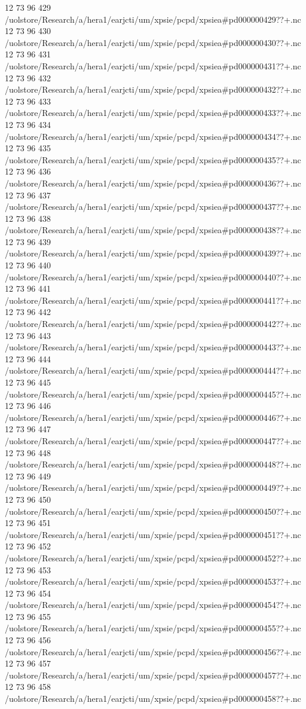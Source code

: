 12 73 96
429
/uolstore/Research/a/hera1/earjcti/um/xpsie/pcpd/xpsiea#pd000000429??+.nc
12 73 96
430
/uolstore/Research/a/hera1/earjcti/um/xpsie/pcpd/xpsiea#pd000000430??+.nc
12 73 96
431
/uolstore/Research/a/hera1/earjcti/um/xpsie/pcpd/xpsiea#pd000000431??+.nc
12 73 96
432
/uolstore/Research/a/hera1/earjcti/um/xpsie/pcpd/xpsiea#pd000000432??+.nc
12 73 96
433
/uolstore/Research/a/hera1/earjcti/um/xpsie/pcpd/xpsiea#pd000000433??+.nc
12 73 96
434
/uolstore/Research/a/hera1/earjcti/um/xpsie/pcpd/xpsiea#pd000000434??+.nc
12 73 96
435
/uolstore/Research/a/hera1/earjcti/um/xpsie/pcpd/xpsiea#pd000000435??+.nc
12 73 96
436
/uolstore/Research/a/hera1/earjcti/um/xpsie/pcpd/xpsiea#pd000000436??+.nc
12 73 96
437
/uolstore/Research/a/hera1/earjcti/um/xpsie/pcpd/xpsiea#pd000000437??+.nc
12 73 96
438
/uolstore/Research/a/hera1/earjcti/um/xpsie/pcpd/xpsiea#pd000000438??+.nc
12 73 96
439
/uolstore/Research/a/hera1/earjcti/um/xpsie/pcpd/xpsiea#pd000000439??+.nc
12 73 96
440
/uolstore/Research/a/hera1/earjcti/um/xpsie/pcpd/xpsiea#pd000000440??+.nc
12 73 96
441
/uolstore/Research/a/hera1/earjcti/um/xpsie/pcpd/xpsiea#pd000000441??+.nc
12 73 96
442
/uolstore/Research/a/hera1/earjcti/um/xpsie/pcpd/xpsiea#pd000000442??+.nc
12 73 96
443
/uolstore/Research/a/hera1/earjcti/um/xpsie/pcpd/xpsiea#pd000000443??+.nc
12 73 96
444
/uolstore/Research/a/hera1/earjcti/um/xpsie/pcpd/xpsiea#pd000000444??+.nc
12 73 96
445
/uolstore/Research/a/hera1/earjcti/um/xpsie/pcpd/xpsiea#pd000000445??+.nc
12 73 96
446
/uolstore/Research/a/hera1/earjcti/um/xpsie/pcpd/xpsiea#pd000000446??+.nc
12 73 96
447
/uolstore/Research/a/hera1/earjcti/um/xpsie/pcpd/xpsiea#pd000000447??+.nc
12 73 96
448
/uolstore/Research/a/hera1/earjcti/um/xpsie/pcpd/xpsiea#pd000000448??+.nc
12 73 96
449
/uolstore/Research/a/hera1/earjcti/um/xpsie/pcpd/xpsiea#pd000000449??+.nc
12 73 96
450
/uolstore/Research/a/hera1/earjcti/um/xpsie/pcpd/xpsiea#pd000000450??+.nc
12 73 96
451
/uolstore/Research/a/hera1/earjcti/um/xpsie/pcpd/xpsiea#pd000000451??+.nc
12 73 96
452
/uolstore/Research/a/hera1/earjcti/um/xpsie/pcpd/xpsiea#pd000000452??+.nc
12 73 96
453
/uolstore/Research/a/hera1/earjcti/um/xpsie/pcpd/xpsiea#pd000000453??+.nc
12 73 96
454
/uolstore/Research/a/hera1/earjcti/um/xpsie/pcpd/xpsiea#pd000000454??+.nc
12 73 96
455
/uolstore/Research/a/hera1/earjcti/um/xpsie/pcpd/xpsiea#pd000000455??+.nc
12 73 96
456
/uolstore/Research/a/hera1/earjcti/um/xpsie/pcpd/xpsiea#pd000000456??+.nc
12 73 96
457
/uolstore/Research/a/hera1/earjcti/um/xpsie/pcpd/xpsiea#pd000000457??+.nc
12 73 96
458
/uolstore/Research/a/hera1/earjcti/um/xpsie/pcpd/xpsiea#pd000000458??+.nc
